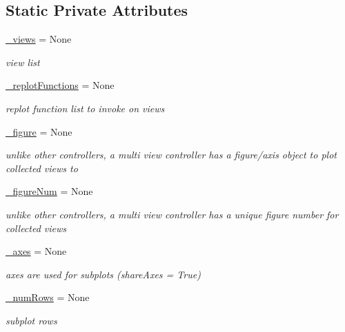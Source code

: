 \subsection*{Static Private Attributes}
\begin{DoxyCompactItemize}
\item 
\hyperlink{class_mu_mo_t_1_1_mu_mo_tmulti_controller_af533f289cf818694f54ab8bd57083537}{\+\_\+views} = None
\begin{DoxyCompactList}\small\item\em view list \end{DoxyCompactList}\item 
\hyperlink{class_mu_mo_t_1_1_mu_mo_tmulti_controller_a223edb833bfba55f245278156e2cb598}{\+\_\+replot\+Functions} = None
\begin{DoxyCompactList}\small\item\em replot function list to invoke on views \end{DoxyCompactList}\item 
\hyperlink{class_mu_mo_t_1_1_mu_mo_tmulti_controller_abf6d9f6be3898e307415d4598cde264d}{\+\_\+figure} = None
\begin{DoxyCompactList}\small\item\em unlike other controllers, a multi view controller has a figure/axis object to plot collected views to \end{DoxyCompactList}\item 
\hyperlink{class_mu_mo_t_1_1_mu_mo_tmulti_controller_a5748371a5f2e09033908d21bb12f94c0}{\+\_\+figure\+Num} = None
\begin{DoxyCompactList}\small\item\em unlike other controllers, a multi view controller has a unique figure number for collected views \end{DoxyCompactList}\item 
\hyperlink{class_mu_mo_t_1_1_mu_mo_tmulti_controller_a302b03ed97754a48ed830efba51e8d37}{\+\_\+axes} = None
\begin{DoxyCompactList}\small\item\em axes are used for subplots (\textquotesingle{}share\+Axes = True\textquotesingle{}) \end{DoxyCompactList}\item 
\hyperlink{class_mu_mo_t_1_1_mu_mo_tmulti_controller_a7943427bc009bd206f958f785e744381}{\+\_\+num\+Rows} = None
\begin{DoxyCompactList}\small\item\em subplot rows \end{DoxyCompactList}\item 

\end{DoxyCompactItemize}
